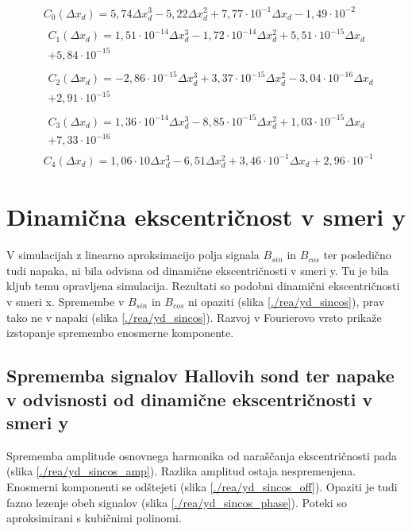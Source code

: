 \begin{eqnarray}
&C_0(\Delta x_d) =5,74\Delta x_d^{3}-5,22\Delta x_d^{2}+7,77\cdot 10^{-1}\Delta x_d-1,49\cdot 10^{-2} \\                               
&\begin{split}C_1(\Delta x_d) =1,51\cdot 10^{-14}\Delta x_d^{3}-1,72\cdot 10^{-14}\Delta x_d^{2}+5,51\cdot 10^{-15}\Delta x_d\\+5,84\cdot 10^{-15}\end{split} \\ 
&\begin{split}C_2(\Delta x_d) =-2,86\cdot 10^{-15}\Delta x_d^{3}+3,37\cdot 10^{-15}\Delta x_d^{2}-3,04\cdot 10^{-16}\Delta x_d\\+2,91\cdot 10^{-15}\end{split} \\
&\begin{split}C_3(\Delta x_d) =1,36\cdot 10^{-14}\Delta x_d^{3}-8,85\cdot 10^{-15}\Delta x_d^{2}+1,03\cdot 10^{-15}\Delta x_d\\+7,33\cdot 10^{-16}\end{split} \\ 
&C_4(\Delta x_d) =1,06\cdot 10\Delta x_d^{3}-6,51\Delta x_d^{2}+3,46\cdot 10^{-1}\Delta x_d+2,96\cdot 10^{-1}
\end{eqnarray}
\section{Dinamična ekscentričnost v smeri y}
V simulacijah z linearno aproksimacijo polja signala $B_{sin}$ in $B_{cos}$ ter posledično tudi napaka, ni bila odvisna od dinamične ekscentričnosti v smeri y. Tu je bila kljub temu opravljena simulacija. Rezultati so podobni dinamični ekscentričnosti v smeri x. Spremembe v $B_{sin}$ in $B_{cos}$ ni opaziti (slika \ref{./rea/yd_sincos}), prav tako ne v napaki (slika \ref{./rea/yd_sincos}). Razvoj v Fourierovo vrsto prikaže izstopanje spremembo enosmerne komponente.
\newpage
\subsection{Sprememba signalov Hallovih sond ter napake v odvisnosti od dinamične ekscentričnosti v smeri y}
Sprememba amplitude osnovnega harmonika od naraščanja ekscentričnosti pada (slika \ref{./rea/yd_sincos_amp}). Razlika amplitud ostaja nespremenjena. Enosmerni komponenti se odštejeti (slika \ref{./rea/yd_sincos_off}). Opaziti je tudi fazno lezenje obeh signalov (slika \ref{./rea/yd_sincos_phase}).  Poteki so aproksimirani s kubičnimi polinomi.

